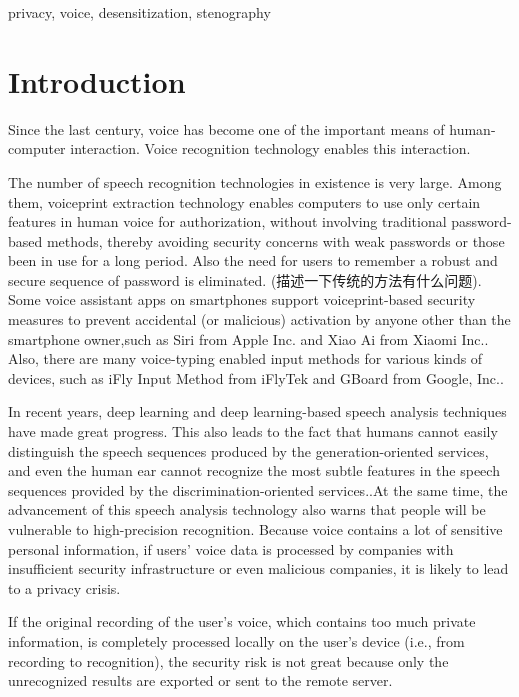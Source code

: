 \documentclass[journal]{IEEEtran} %
\begin{document}
\begin{CJK*}{UTF8}{gbsn}
\begin{IEEEkeywords}
    privacy, voice, desensitization, stenography
\end{IEEEkeywords}

\section{Introduction}
Since the last century, voice has become one of the important means of human-computer interaction. Voice recognition technology enables this interaction.

The number of speech recognition technologies in existence is very large. Among them, voiceprint extraction technology enables computers to use only certain features in human voice for authorization, without involving traditional password-based methods, thereby avoiding security concerns with weak passwords or those been in use for a long period. Also the need for users to remember a robust and secure sequence of password is eliminated. (描述一下传统的方法有什么问题). Some voice assistant apps on smartphones support voiceprint-based security measures to prevent accidental (or malicious) activation by anyone other than the smartphone owner,such as Siri from Apple Inc. and Xiao Ai from Xiaomi Inc.\cite{a19, a20}. Also, there are many voice-typing enabled input methods for various kinds of devices, such as iFly Input Method from iFlyTek and GBoard from Google, Inc.\cite{a21, a22}.

In recent years, deep learning and deep learning-based speech analysis techniques have made great progress. This also leads to the fact that humans cannot easily distinguish the speech sequences produced by the generation-oriented services, and even the human ear cannot recognize the most subtle features in the speech sequences provided by the discrimination-oriented services.\cite{a12}.At the same time, the advancement of this speech analysis technology also warns that people will be vulnerable to high-precision recognition\cite{a6, a7}. Because voice contains a lot of sensitive personal information, if users' voice data is processed by companies with insufficient security infrastructure or even malicious companies, it is likely to lead to a privacy crisis.

If the original recording of the user's voice, which contains too much private information, is completely processed locally on the user's device (i.e., from recording to recognition), the security risk is not great because only the unrecognized results are exported or sent to the remote server.


\end{CJK*}
\end{document}
